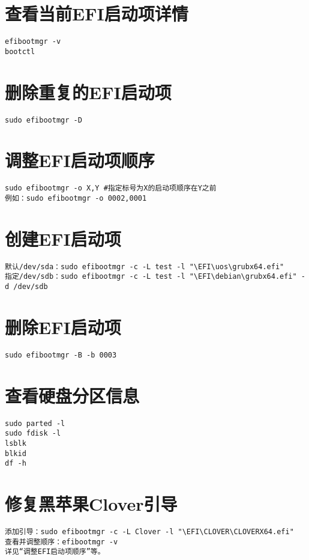 \documentclass[a4paper,fontset=fandol,zihao=-4,linespread=1.2]{ctexbook}
\begin{document}
\section{查看当前EFI启动项详情}
\begin{lstlisting}
efibootmgr -v
bootctl
\end{lstlisting}

\section{删除重复的EFI启动项}
\begin{lstlisting}
sudo efibootmgr -D
\end{lstlisting}

\section{调整EFI启动项顺序}
\begin{lstlisting}
sudo efibootmgr -o X,Y #指定标号为X的启动项顺序在Y之前
例如：sudo efibootmgr -o 0002,0001
\end{lstlisting}

\section{创建EFI启动项}
\begin{lstlisting}
默认/dev/sda：sudo efibootmgr -c -L test -l "\EFI\uos\grubx64.efi"
指定/dev/sdb：sudo efibootmgr -c -L test -l "\EFI\debian\grubx64.efi" -d /dev/sdb
\end{lstlisting}

\section{删除EFI启动项}
\begin{lstlisting}
sudo efibootmgr -B -b 0003
\end{lstlisting}

\section{查看硬盘分区信息}
\begin{lstlisting}
sudo parted -l
sudo fdisk -l
lsblk
blkid
df -h
\end{lstlisting}

\section{修复黑苹果Clover引导}
\begin{lstlisting}
添加引导：sudo efibootmgr -c -L Clover -l "\EFI\CLOVER\CLOVERX64.efi"
查看并调整顺序：efibootmgr -v
详见“调整EFI启动项顺序”等。
\end{lstlisting}
\end{document}
